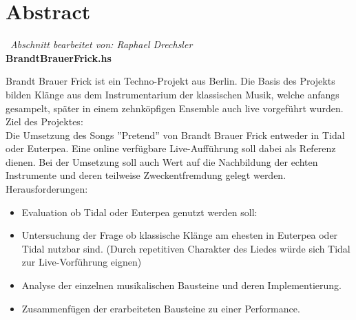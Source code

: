 \documentclass[
10pt, %
a4paper, %
oneside, %
headinclude,footinclude, %
BCOR5mm, %
]{scrartcl}
\begin{document}





\newpage %

\section{Abstract}\
\textit{Abschnitt bearbeitet von: Raphael Drechsler}\\

\noindent \textbf{BrandtBrauerFrick.hs}

\noindent Brandt Brauer Frick ist ein Techno-Projekt aus Berlin.
Die Basis des Projekts bilden Klänge aus dem Instrumentarium der
klassischen Musik, welche anfangs gesampelt, später in einem zehnköpfigen
Ensemble auch live vorgeführt wurden.\cite{Wiki}\\ 

\noindent Ziel des Projektes:\\
Die Umsetzung des Songs ''Pretend'' von Brandt Brauer Frick entweder in
Tidal oder Euterpea. Eine online verfügbare Live-Aufführung \cite{YT1} soll dabei als Referenz dienen. Bei der Umsetzung soll auch Wert auf die Nachbildung der echten Instrumente und deren teilweise Zweckentfremdung gelegt werden.\\

\noindent Herausforderungen:
\begin{itemize}
	\itemsep0em
	\item Evaluation ob Tidal\cite{Tidal} oder Euterpea\cite{Euterpea} genutzt werden soll:
	\item Untersuchung der Frage ob klassische Klänge am ehesten in Euterpea oder
	Tidal nutzbar sind. (Durch repetitiven Charakter des Liedes würde sich Tidal zur
	Live-Vorführung eignen)
	\item Analyse der einzelnen musikalischen Bausteine und deren Implementierung.
	\item Zusammenfügen der erarbeiteten Bausteine zu einer Performance.
\end{itemize}
\end{document}
